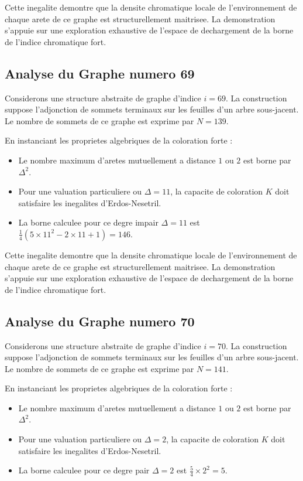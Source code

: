\documentclass[11pt,a4paper]{article}
\begin{document}
Cette inegalite demontre que la densite chromatique locale de l'environnement de chaque arete de ce graphe est structurellement maitrisee. La demonstration s'appuie sur une exploration exhaustive de l'espace de dechargement de la borne de l'indice chromatique fort.

\subsection{Analyse du Graphe numero 69}
Considerons une structure abstraite de graphe d'indice $i = 69$. La construction suppose l'adjonction de sommets terminaux sur les feuilles d'un arbre sous-jacent. Le nombre de sommets de ce graphe est exprime par $N = 139$.

En instanciant les proprietes algebriques de la coloration forte :
\begin{itemize}
\item Le nombre maximum d'aretes mutuellement a distance $1$ ou $2$ est borne par $\Delta^2$.
\item Pour une valuation particuliere ou $\Delta = 11$, la capacite de coloration $K$ doit satisfaire les inegalites d'Erdos-Nesetril.
\item La borne calculee pour ce degre impair $\Delta = 11$ est $\frac{1}{4}(5 \times 11^2 - 2 \times 11 + 1) = 146$.
\end{itemize}

Cette inegalite demontre que la densite chromatique locale de l'environnement de chaque arete de ce graphe est structurellement maitrisee. La demonstration s'appuie sur une exploration exhaustive de l'espace de dechargement de la borne de l'indice chromatique fort.

\subsection{Analyse du Graphe numero 70}
Considerons une structure abstraite de graphe d'indice $i = 70$. La construction suppose l'adjonction de sommets terminaux sur les feuilles d'un arbre sous-jacent. Le nombre de sommets de ce graphe est exprime par $N = 141$.

En instanciant les proprietes algebriques de la coloration forte :
\begin{itemize}
\item Le nombre maximum d'aretes mutuellement a distance $1$ ou $2$ est borne par $\Delta^2$.
\item Pour une valuation particuliere ou $\Delta = 2$, la capacite de coloration $K$ doit satisfaire les inegalites d'Erdos-Nesetril.
\item La borne calculee pour ce degre pair $\Delta = 2$ est $\frac{5}{4} \times 2^2 = 5$.
\end{itemize}
\end{document}
